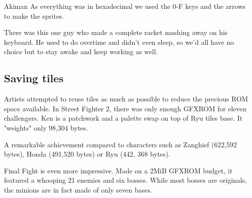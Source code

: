 \begin{q}{Akiman\cite{ar20160404}}
  As everything was in hexadecimal we used the 0-F keys and the arrows to make the sprites. 

  There was this one guy who made a complete racket mashing away on his keyboard. He used to do overtime and didn't even sleep, so we'd all have no choice but to stay awake and keep working as well.
\end{q}


\subsection{Saving tiles}
Artists attempted to reuse tiles as much as possible to reduce the precious ROM space available. In Street Fighter 2, there was only enough GFXROM for eleven challengers. Ken is a patchwork and a palette swap on top of Ryu tiles base. It "weights" only 98,304 bytes.

\begin{minipage}[t]{0.19\linewidth}
\end{minipage}%
\hfill%
\begin{minipage}[t]{0.19\linewidth}
\end{minipage}
\hfill%
\begin{minipage}[t]{0.19\linewidth}
\end{minipage}%
\hfill%
\begin{minipage}[t]{0.19\linewidth}
\end{minipage}
\hfill%
\begin{minipage}[t]{0.19\linewidth}
\end{minipage}


A remarkable achievement compared to characters such as Zanghief (622,592 bytes), Honda (491,520 bytes) or Ryu (442, 368 bytes). 


Final Fight is even more impressive. Made on a 2MiB GFXROM budget, it featured a whooping 21 enemies and six bosses. While most bosses are originals, the minions are in fact made of only seven bases.

\begin{minipage}[t]{0.30\linewidth}
\end{minipage}
\hfill%
\begin{minipage}[t]{0.30\linewidth}
\end{minipage}
\hfill%
\begin{minipage}[t]{0.30\linewidth}
\end{minipage}



